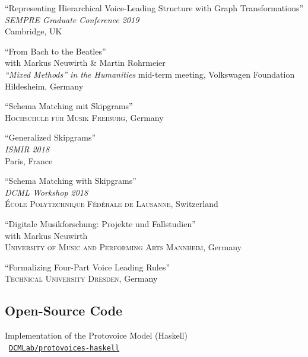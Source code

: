 \documentclass[10pt]{scrartcl}
\newcommand{\margintext}[1]{\marginpar{\raggedleft\small#1}}
\newcommand{\entry}[1]{\vphantom{x}\margintext{#1}}
\begin{document}
\poster \enquote{Representing Hierarchical Voice-Leading Structure with Graph Transformations}\\
\textit{SEMPRE Graduate Conference 2019}\\
Cambridge, UK

\contrib \enquote{From Bach to the Beatles}
\\
with Markus Neuwirth \& Martin Rohrmeier\\
\textit{\enquote{Mixed Methods} in the Humanities} mid-term meeting, Volkswagen Foundation\\
Hildesheim, Germany

\invited \enquote{Schema Matching mit Skipgrams}
\\
\textsc{Hochschule für Musik Freiburg}, Germany

\entry{2018}%
\contrib \poster \enquote{Generalized Skipgrams}
\\
\textit{ISMIR 2018}\\
Paris, France

\invited \enquote{Schema Matching with Skipgrams}
\\
\textit{DCML Workshop 2018}\\
\textsc{École Polytechnique Fédérale de Lausanne}, Switzerland

\invited \enquote{Digitale Musikforschung: Projekte und Fallstudien}
\\
with Markus Neuwirth\\
\textsc{University of Music and Performing Arts Mannheim}, Germany

\entry{2017}%
\invited \enquote{Formalizing Four-Part Voice Leading Rules}
\\
\textsc{Technical University Dresden}, Germany

\subsection*{Open-Source Code}

\newcommand{\codelink}[1]{\faCodeFork\ \href{https://#1}{\nolinkurl{#1}}}
\newcommand{\ghlink}[1]{\faGithub\ \href{https://github.com/#1}{\nolinkurl{#1}}}

Implementation of the Protovoice Model (Haskell)\\
\ghlink{DCMLab/protovoices-haskell}
\end{document}

